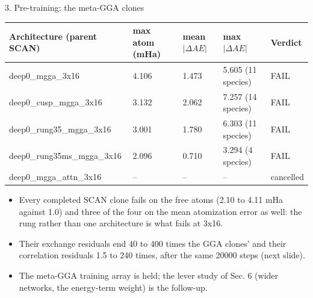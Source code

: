 \begin{frame}{3. Pre-training: the meta-GGA clones}
  \small
  \begin{center}\footnotesize
  \begin{tabular}{lllll}
  \toprule
  Architecture (parent SCAN) & max atom (mHa) & mean $|\Delta AE|$ & max $|\Delta AE|$ & Verdict \\ \midrule
  deep0\_mgga\_3x16 & 4.106 & 1.473 & 5.605 (11 species) & FAIL \\
  deep0\_cusp\_mgga\_3x16 & 3.132 & 2.062 & 7.257 (14 species) & FAIL \\
  deep0\_rung35\_mgga\_3x16 & 3.001 & 1.780 & 6.303 (11 species) & FAIL \\
  deep0\_rung35ms\_mgga\_3x16 & 2.096 & 0.710 & 3.294 (4 species) & FAIL \\
  deep0\_mgga\_attn\_3x16 & -- & -- & -- & cancelled \\
  \bottomrule
  \end{tabular}
  \end{center}
  \footnotesize
  \begin{itemize}
    \item Every completed SCAN clone fails on the free atoms (2.10 to 4.11 mHa against 1.0) and three of the four on the mean atomization error as well: the rung rather than one architecture is what fails at 3x16.
    \item Their exchange residuals end 40 to 400 times the GGA clones' and their correlation residuals 1.5 to 240 times, after the same 20000 steps (next slide).
    \item The meta-GGA training array is held; the lever study of Sec. 6 (wider networks, the energy-term weight) is the follow-up.
  \end{itemize}
\end{frame}
